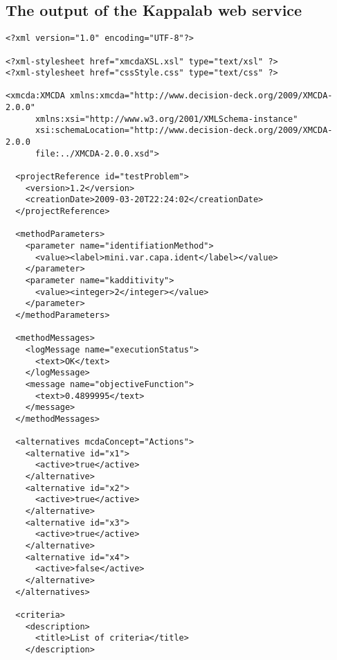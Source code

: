 \documentclass[a4paper,oneside,10 pt]{article}
\newcommand{\code}{\asciifamily}
\begin{document}
\subsection{The output of the Kappalab web service}
\begin{multicols}{2}
{\code
\begin{lstlisting}[style=prototype, basicstyle=\tiny]
<?xml version="1.0" encoding="UTF-8"?>

<?xml-stylesheet href="xmcdaXSL.xsl" type="text/xsl" ?>
<?xml-stylesheet href="cssStyle.css" type="text/css" ?>

<xmcda:XMCDA xmlns:xmcda="http://www.decision-deck.org/2009/XMCDA-2.0.0" 
      xmlns:xsi="http://www.w3.org/2001/XMLSchema-instance" 
      xsi:schemaLocation="http://www.decision-deck.org/2009/XMCDA-2.0.0
      file:../XMCDA-2.0.0.xsd">

  <projectReference id="testProblem">
    <version>1.2</version>
    <creationDate>2009-03-20T22:24:02</creationDate>
  </projectReference>

  <methodParameters>
    <parameter name="identifiationMethod">
      <value><label>mini.var.capa.ident</label></value>
    </parameter>
    <parameter name="kadditivity">
      <value><integer>2</integer></value>
    </parameter>
  </methodParameters>
  
  <methodMessages>
    <logMessage name="executionStatus">
      <text>OK</text>
    </logMessage>
    <message name="objectiveFunction">
      <text>0.4899995</text>
    </message>
  </methodMessages>

  <alternatives mcdaConcept="Actions">
    <alternative id="x1">
      <active>true</active>
    </alternative>
    <alternative id="x2">
      <active>true</active>
    </alternative>
    <alternative id="x3">
      <active>true</active>
    </alternative>
    <alternative id="x4">
      <active>false</active>
    </alternative>
  </alternatives>

  <criteria>
    <description>
      <title>List of criteria</title>
    </description>


\end{lstlisting}}
\end{multicols}
\end{document}
